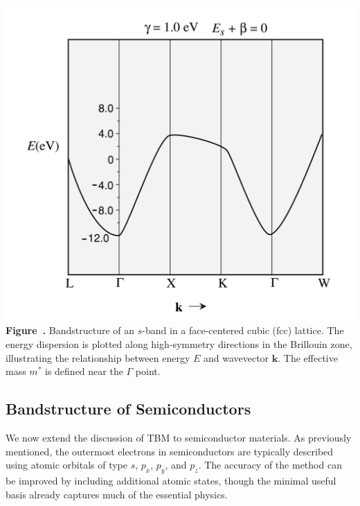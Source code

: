 \begin{center}
	\begin{minipage}{0.6\textwidth}
		\centering
		\includegraphics[width=\textwidth]{img/s-band-model.png}
		\\[0.5em]
		\textbf{Figure~\thefigure.} Bandstructure of an \(s\)-band in a face-centered cubic (fcc) lattice. The energy dispersion is plotted along high-symmetry directions in the Brillouin zone, illustrating the relationship between energy \( E \) and wavevector \( \mathbf{k} \). The effective mass \( m^* \) is defined near the \( \Gamma \) point.
		\label{fig:s-band-model}
	\end{minipage}
\end{center}


\subsection{Bandstructure of Semiconductors}
We now extend the discussion of TBM to semiconductor materials. As previously mentioned, the outermost electrons in semiconductors are typically described using atomic orbitals of type \( s \), \( p_x \), \( p_y \), and \( p_z \). The accuracy of the method can be improved by including additional atomic states, though the minimal useful basis already captures much of the essential physics.

